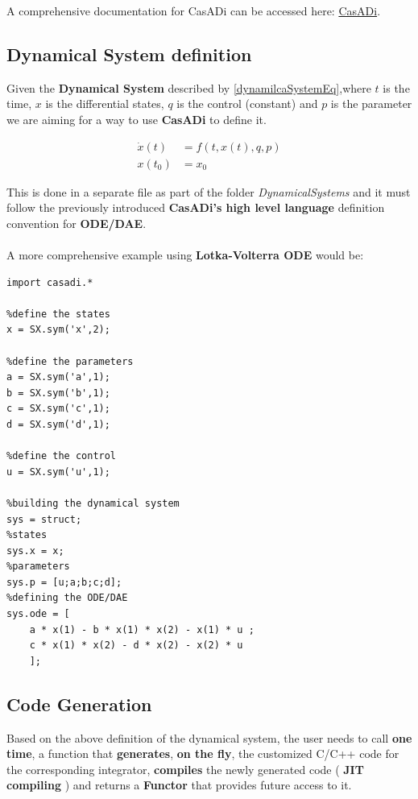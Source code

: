 \documentclass[12pt, letterpaper]{article}
\begin{document}
A comprehensive documentation for CasADi can be accessed here: \href{https://web.casadi.org/docs/}{CasADi}.


\subsection{Dynamical System definition}
\label{label_DynamicalSystemDefinition}

Given the \textbf{Dynamical System} described by \ref{dynamilcaSystemEq},where $t$ is the time, $x$ is the differential states, $q$ is the control (constant) and $p$ is the parameter we  are aiming for a way to use \textbf{CasADi} to define it.

\begin{subequations}
\label{dynamilcaSystemEq}
\begin{align}
\dot{x}(t) &= f(t, x(t), q, p)   \\
x(t_0) &=x_0
\end{align}
\end{subequations}

This is done in a separate file as part of the folder  \textit{DynamicalSystems} and it must follow the previously introduced \textbf{CasADi's high level language} definition convention for \textbf{ODE/DAE}. 
\\
\\
A more comprehensive example using \textbf{Lotka-Volterra ODE} would be:

\begin{lstlisting}
import casadi.*

%define the states
x = SX.sym('x',2);

%define the parameters
a = SX.sym('a',1);
b = SX.sym('b',1);
c = SX.sym('c',1);
d = SX.sym('d',1);

%define the control
u = SX.sym('u',1);

%building the dynamical system
sys = struct;
%states
sys.x = x;
%parameters
sys.p = [u;a;b;c;d];
%defining the ODE/DAE
sys.ode = [ 
    a * x(1) - b * x(1) * x(2) - x(1) * u ; 
    c * x(1) * x(2) - d * x(2) - x(2) * u 
    ];
\end{lstlisting}

\subsection{Code Generation}

Based on the above definition of the dynamical system, the user needs to call \textbf{one time}, a function that \textbf{generates}, \textbf{on the fly}, the customized C/C++ code for the corresponding integrator, \textbf{compiles} the newly generated code ( \textbf{JIT compiling} ) and returns a \textbf{Functor} that provides future access to it.
\end{document}
